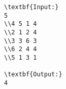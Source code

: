 \begin{verbatim}
\textbf{Input:}
5 
\\4 5 1 4 
\\2 1 2 4 
\\3 3 6 3 
\\6 2 4 4 
\\5 1 3 1

\textbf{Output:}
4
\end{verbatim}